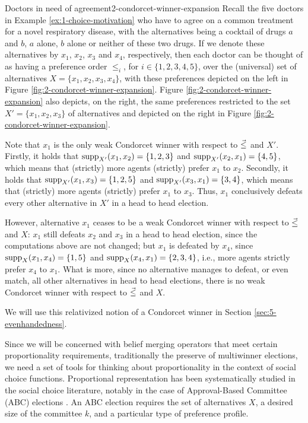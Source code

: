\begin{xmpl}{Doctors in need of agreement}{2-condorcet-winner-expansion}
	Recall the five doctors in Example \ref{ex:1-choice-motivation}
	who have to agree on a common treatment for a novel respiratory disease,
	with the alternatives being a cocktail of drugs $a$ and $b$, $a$ alone, 
	$b$ alone or neither of these two drugs.
	If we denote these alternatives by $x_1$, $x_2$, $x_3$ and $x_4$,
	respectively, then each doctor can be thought of as having a preference 
	order $\le_i$, for $i\in\{1,2,3,4,5\}$,
	over the (universal) set of alternatives $X = \{x_1,x_2,x_3,x_4\}$,
	with these preferences depicted on the left in Figure \ref{fig:2-condorcet-winner-expansion}.
	Figure \ref{fig:2-condorcet-winner-expansion} also depicts, on the right,
	the same preferences restricted to the set $X' = \{x_1,x_2,x_3\}$
	of alternatives and depicted on the right in Figure \ref{fig:2-condorcet-winner-expansion}.

	Note that $x_1$ is the only weak Condorcet winner with respect to ${\vec{\le}}$ and $X'$.
	Firstly, 
	it holds that 
	${\operatorname{supp}}_{X'}(x_1,x_2)=\{1,2,3\}$ and 
	${\operatorname{supp}}_{X'}(x_2,x_1)=\{4,5\}$,
	which means that (strictly) more agents (strictly) prefer $x_1$ to $x_2$.
	Secondly, 
	it holds that 
	${\operatorname{supp}}_{X'}(x_1,x_3)=\{1,2,5\}$ and 
	${\operatorname{supp}}_{X'}(x_3,x_1)=\{3,4\}$,
	which means that (strictly) more agents (strictly) prefer $x_1$ to $x_3$.
	Thus, $x_1$ conclusively 
	defeats every other alternative in $X'$ in a head to head election.

	However, alternative $x_1$ ceases to be a weak Condorcet winner
	with respect to ${\vec{\le}}$ and $X$:
	$x_1$ still defeats $x_2$ and $x_3$ in a head to head election, 
	since the computations above are not changed;
	but $x_1$ is defeated by $x_4$, since 
	${\operatorname{supp}}_{X}(x_1,x_4)=\{1,5\}$ and 
	${\operatorname{supp}}_{X}(x_4,x_1)=\{2,3,4\}$,
	i.e., more agents strictly prefer $x_4$ to $x_1$. 
	What is more, since no alternative manages to defeat,
	or even match, all other alternatives
	in head to head elections, 
	there is no weak Condorcet winner with respect to ${\vec{\le}}$ and $X$.
\end{xmpl}

We will use this relativized notion of a Condorcet winner in Section \ref{sec:5-evenhandedness}.

Since we will be concerned with belief merging operators that meet certain 
proportionality requirements, 
traditionally the preserve of multiwinner elections,
we need a set of tools for thinking about proportionality 
in the context of social choice functions.
Proportional representation has been systematically studied in the social choice literature,
notably in the case of Approval-Based Committee (ABC) elections \cite{FaliszewskiSST17}.
An ABC election requires the set of alternatives $X$, 
a desired size of the committee $k$, 
and a particular type of preference profile.

